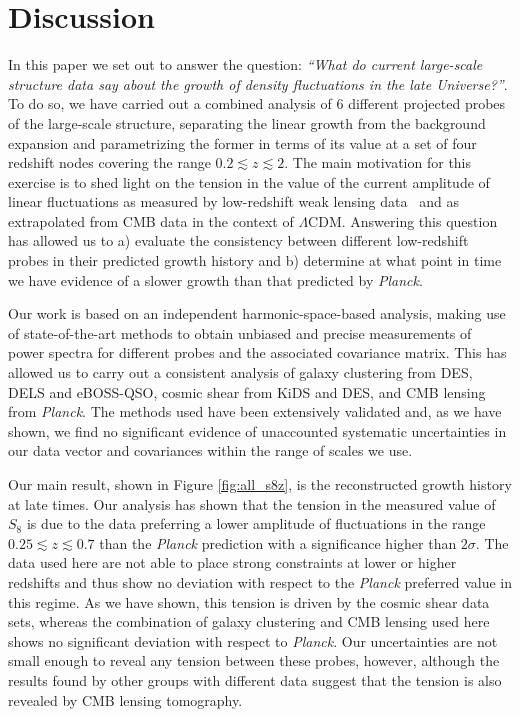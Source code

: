 \documentclass[a4paper,11pt]{article}
\newcommand{\lcdm}{$\Lambda$CDM\xspace}
\newcommand{\des}{DES\xspace}
\newcommand{\kids}{KiDS\xspace}
\newcommand{\planck}{{\sl Planck}\xspace}
\newcommand{\eboss}{eBOSS-QSO\xspace}
\newcommand{\dls}{DELS\xspace}
\begin{document}
  \section{Discussion}\label{sec:disc}
    In this paper we set out to answer the question: \emph{``What do current large-scale structure data say about the growth of density fluctuations in the late Universe?''}. To do so, we have carried out a combined analysis of 6 different projected probes of the large-scale structure, separating the linear growth from the background expansion and parametrizing the former in terms of its value at a set of four redshift nodes covering the range $0.2\lesssim z\lesssim 2$. The main motivation for this exercise is to shed light on the tension in the value of the current amplitude of linear fluctuations as measured by low-redshift weak lensing data~\cite{1708.01538, 2007.15632, 1809.09148} and as extrapolated from CMB data in the context of \lcdm. Answering this question has allowed us to a) evaluate the consistency between different low-redshift probes in their predicted growth history and b) determine at what point in time we have evidence of a slower growth than that predicted by \planck.

    Our work is based on an independent harmonic-space-based analysis, making use of state-of-the-art methods to obtain unbiased and precise measurements of power spectra  for different probes and the associated covariance matrix. This has allowed us to carry out a consistent analysis of galaxy clustering from \des, \dls and \eboss, cosmic shear from \kids and \des, and CMB lensing from \planck. The methods used have been extensively validated and, as we have shown, we find no significant evidence of unaccounted systematic uncertainties in our data vector and covariances within the range of scales we use.

    Our main result, shown in Figure \ref{fig:all_s8z}, is the reconstructed growth history at late times. Our analysis has shown that the tension in the measured value of $S_8$ is due to the data preferring a lower amplitude of fluctuations in the range $0.25\lesssim z\lesssim 0.7$ than the \planck prediction with a significance higher than $2\sigma$. The data used here are not able to place strong constraints at lower or higher redshifts and thus show no deviation with respect to the \planck preferred value in this regime. As we have shown, this tension is driven by the cosmic shear data sets, whereas the combination of galaxy clustering and CMB lensing used here shows no significant deviation with respect to \planck. Our uncertainties are not small enough to reveal any tension between these probes, however, although the results found by other groups with different data \citep{2105.03421} suggest that the tension is also revealed by CMB lensing tomography.
\end{document}
